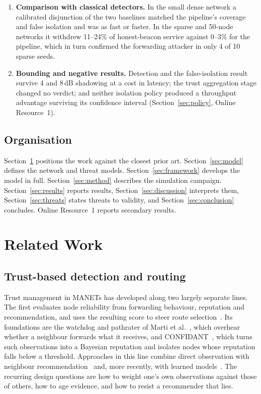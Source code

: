 \documentclass[pdflatex,sn-mathphys-num]{sn-jnl}%
\theoremstyle{thmstyleone}%
\theoremstyle{thmstyletwo}%
\theoremstyle{thmstylethree}%
\begin{document}
\begin{enumerate}
\item \textbf{Comparison with classical detectors.} In the small dense
      network a calibrated disjunction of the two baselines matched the
      pipeline's coverage and false isolation and was as fast or faster. In
      the sparse and 50-node networks it withdrew 11--24\% of honest-beacon
      service against 0--3\% for the pipeline, which in turn confirmed the
      forwarding attacker in only 4 of 10 sparse seeds.

\item \textbf{Bounding and negative results.} Detection and the
      false-isolation result survive 4 and 8\,dB shadowing at a cost in
      latency; the trust aggregation stage changed no verdict; and neither
      isolation policy produced a throughput advantage surviving its
      confidence interval (Section~\ref{sec:policy}, Online Resource~1).
\end{enumerate}

\subsection{Organisation}

Section~\ref{sec:related} positions the work against the closest prior art.
Section~\ref{sec:model} defines the network and threat models.
Section~\ref{sec:framework} develops the model in full.
Section~\ref{sec:method} describes the simulation campaign.
Section~\ref{sec:results} reports results, Section~\ref{sec:discussion}
interprets them, Section~\ref{sec:threats} states threats to validity, and
Section~\ref{sec:conclusion} concludes. Online Resource~1
reports secondary results.

\section{Related Work}
\label{sec:related}

\subsection{Trust-based detection and routing}

Trust management in MANETs has developed along two largely separate lines.
The first evaluates node reliability from forwarding behaviour, reputation
and recommendation, and uses the resulting score to steer route
selection~\cite{cai2019evolutionary,xia2013trust,sirajuddin2021tbsmr,singh2020self}.
Its foundations are the watchdog and pathrater of Marti
et al.~\cite{marti2000mitigating}, which overhear whether a neighbour forwards
what it receives, and CONFIDANT~\cite{buchegger2002confidant}, which turns
such observations into a Bayesian reputation and isolates nodes whose
reputation falls below a threshold.
Approaches in this line combine direct observation with neighbour
recommendation~\cite{singh2020self,sanchez2015model} and, more recently,
with learned models~\cite{dhand2025secure,mahamune2024trust}. The recurring
design questions are how to weight one's own observations against those of
others, how to age evidence, and how to resist a recommender that lies.
\end{document}
